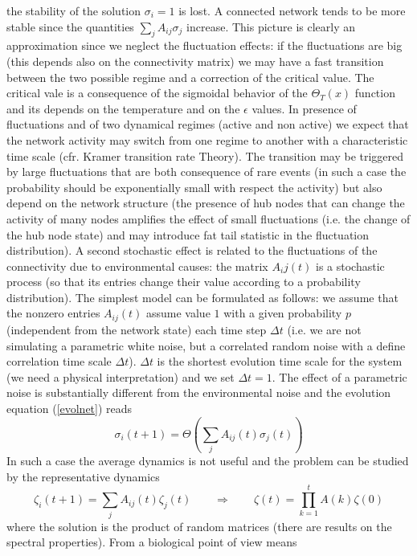 the stability of the solution $\sigma_i=1$ is lost. A connected network tends to be more stable since the quantities
$\sum_j A_{ij}\sigma_j$ increase.  This picture is clearly an approximation since we neglect the fluctuation effects: if the fluctuations are big (this
depends also on the connectivity matrix) we may have a fast transition between the two possible regime and a correction of the critical value. The
critical vale is a consequence of the sigmoidal behavior of the $\Theta_T(x)$ function and its depends on the temperature and on the $\epsilon$
values. In presence of fluctuations and of two dynamical regimes (active and non active) we expect that the network activity may switch from one regime
to another with a characteristic time scale (cfr. Kramer transition rate Theory). The transition may be triggered by large fluctuations that are both consequence
of rare events (in such a case the probability should be exponentially small with respect the activity) but also depend on the network structure (the presence of
hub nodes that can change the activity of many nodes amplifies the effect of small fluctuations (i.e. the change of the hub node state) and may introduce
fat tail statistic in the fluctuation distribution). A second stochastic effect is related to the fluctuations of the connectivity due to environmental causes: 
the matrix $A_ij(t)$ is a stochastic process (so that its entries change their value according to a probability distribution). The simplest model can be formulated as
follows: we assume that the nonzero entries $A_{ij}(t)$ assume value $1$ with a given probability $p$ (independent from the network state)
 each time step $\Delta t$ (i.e. we are not simulating
a parametric white noise, but a correlated random noise with a define correlation time scale $\Delta t$). $\Delta t$ is the shortest evolution time scale
for the system (we need a physical interpretation) and we set $\Delta t=1$. The effect of a parametric noise is substantially different from the environmental noise
and the evolution equation (\ref{evolnet}) reads
\begin{equation}
\sigma_i(t+1)=\Theta\left (\sum_j A_{ij}(t)\sigma_j(t)\right )
\label{evolnetstoc}
\end{equation}
In such a case the average dynamics is not useful and the problem can be studied by the representative dynamics
$$
\zeta_i(t+1)=\sum_j A_{ij}(t)\zeta_j(t)\qquad \Rightarrow \qquad \zeta(t)=\prod_{k=1}^t A(k)\zeta(0)
$$
where the solution is the product of random matrices (there are results on the spectral properties). From a biological point of view means
